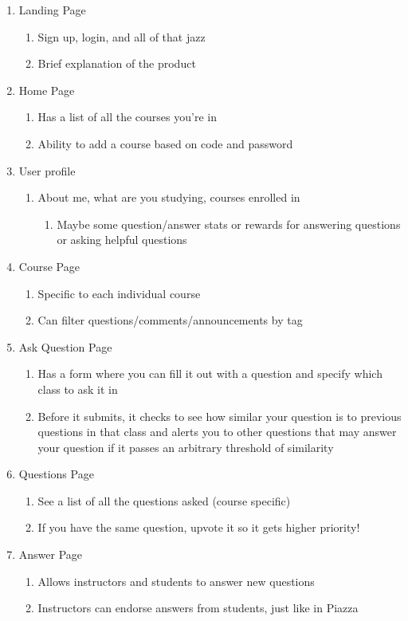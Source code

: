 \documentclass[preprint,11pt,3p]{article}
\begin{document}
\begin{enumerate}
	\item Landing Page
		\begin{enumerate}
			\item Sign up, login, and all of that jazz
			\item Brief explanation of the product
		\end{enumerate}
	\item Home Page
		\begin{enumerate}
			\item Has a list of all the courses you’re in
			\item Ability to add a course based on code and password
		\end{enumerate}
	\item User profile
		\begin{enumerate}
			\item About me, what are you studying, courses enrolled in
				\begin{enumerate}
					\item Maybe some question/answer stats or rewards for answering questions or asking helpful questions
				\end{enumerate}
		\end{enumerate}
	\item Course Page
		\begin{enumerate}
			\item Specific to each individual course 
			\item Can filter questions/comments/announcements by tag
		\end{enumerate}
	\item Ask Question Page
		\begin{enumerate}
			\item Has a form where you can fill it out with a question and specify which class to ask it in 
			\item Before it submits, it checks to see how similar your question is to previous questions in that class and alerts you to other questions that may answer your question if it passes an arbitrary threshold of similarity  
		\end{enumerate}
	\item Questions Page
		\begin{enumerate}
			\item See a list of all the questions asked (course specific) 
			\item If you have the same question, upvote it so it gets higher priority! 
		\end{enumerate}
	\item Answer Page
		\begin{enumerate}
			\item Allows instructors and students to answer new questions 
			\item Instructors can endorse answers from students, just like in Piazza
		\end{enumerate}
\end{enumerate}	
\end{document}

